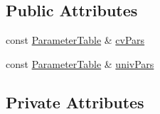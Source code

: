 \subsection*{Public Attributes}
\begin{DoxyCompactItemize}
\item 
const \hyperlink{class_neutrino_flux_reweight_1_1_parameter_table}{Parameter\-Table} \& \hyperlink{class_neutrino_flux_reweight_1_1_m_i_p_p_numi_kaon_yields_reweighter_a39b091512948ed98beae0d341efa6d23}{cv\-Pars}
\item 
const \hyperlink{class_neutrino_flux_reweight_1_1_parameter_table}{Parameter\-Table} \& \hyperlink{class_neutrino_flux_reweight_1_1_m_i_p_p_numi_kaon_yields_reweighter_aef5aab54416e696526aa8ae2c92d1fd8}{univ\-Pars}
\end{DoxyCompactItemize}
\subsection*{Private Attributes}
